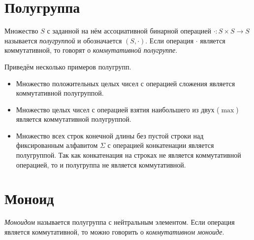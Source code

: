 \section{Полугруппа}

\begin{definition}[Полугруппа]
    Множество $S$ с заданной на нём ассоциативной бинарной операцией $\cdot: S \times S \to S$ называется \emph{полугруппой} и обозначается $(S, \cdot)$.
    Если операция $\cdot$ является коммутативной, то говорят о \emph{коммутативной полугруппе}.
\end{definition}

\begin{example}
    Приведём несколько примеров полугрупп.
    \begin{itemize}
        \item Множество положительных целых чисел с операцией сложения является коммутативной полугруппой.
        \item Множество целых чисел с операцией взятия наибольшего из двух ($\max$) является коммутативной полугруппой.
        \item Множество всех строк конечной длины без пустой строки%
              над фиксированным алфавитом $\Sigma$ с операцией конкатенации является полугруппой.
              Так как конкатенация на строках не является коммутативной операцией, то и полугруппа не является коммутативной.
    \end{itemize}
\end{example}

\section{Моноид}

\begin{definition}[Моноид]
    \emph{Моноидом} называется полугруппа с нейтральным элементом.
    Если операция является коммутативной, то можно говорить о \emph{коммутативном моноиде}.
\end{definition}

